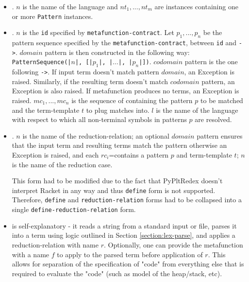 \begin{itemize}
\item
\TlDefineLanguage. $n$ is the name of the language and $nt_1,...,nt_m$ are \NtDefinitionN \space instances containing one or more \texttt{Pattern} instances.

\item
\TlDefineMetafunction. $n$ is the \texttt{id} specified by \texttt{metafunction-contract}. Let $p_1, ..., p_n$ be the pattern sequence specified by the \texttt{metafunction-contract}, between \texttt{id} and \texttt{->}. $domain$ pattern is then constructed in the following way: \texttt{PatternSequence(|$n$|, [|$p_1$|, |$...$|, |$p_n$|])}. $codomain$ pattern is the one following \texttt{->}. If input term doesn't match pattern $domain$, an Exception is raised. Similarly, if the resulting term doesn't match $codomain$ pattern, an Exception is also raised. If metafunction produces no terms, an Exception is raised. $mc_1,...,mc_n$ is the sequence of \space \MetafunctionCase \space containing the pattern $p$ to be matched and the term-template $t$ to plug matches into. $l$ is the name of the language with respect to which all non-terminal symbols in patterns $p$ are resolved.

\item \TlDefineReductionRelation. $n$ is the name of the reduction-relation; an optional $domain$ pattern ensures that the input term and resulting terms match the pattern otherwise an Exception is raised, and each $rc_i$=\ReductionCase \space contains a pattern $p$ and term-template $t$; $n$ is the name of the reduction case.

This form had to be modified due to the fact that PyPltRedex doesn't interpret Racket in any way and thus \texttt{define} form is not supported. Therefore, \texttt{define} and \texttt{reduction-relation} forms had to be collapsed into a single \texttt{define-reduction-relation} form.

\item \ReadFromStdinAndApplyReductionRelation \space is self-explanatory -  it reads a string from a standard input or file, parses it into a term using logic outlined in Section \ref{section:lex-parse}, and applies a reduction-relation with name $r$. Optionally, one can provide the metafunction with a name $f$ to apply to the parsed term before application of $r$. This allows for separation of the specification of "code" from everything else that is required to evaluate the "code" (such as model of the heap/stack, etc).
\end{itemize}

